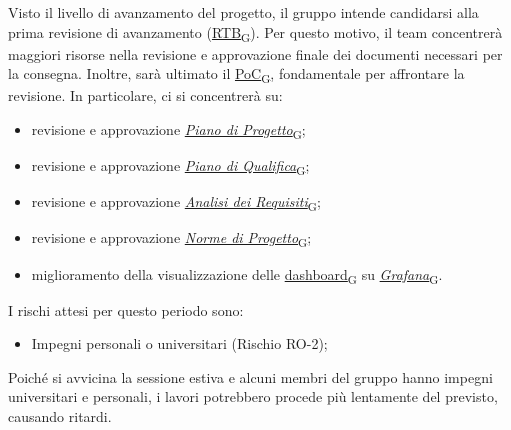 Visto il livello di avanzamento del progetto, il gruppo intende candidarsi alla prima revisione di avanzamento (\href{https://7last.github.io/docs/rtb/documentazione-interna/glossario\#requirements-and-technology-baseline}{RTB\textsubscript{G}}). Per questo motivo, il team concentrerà maggiori risorse nella revisione e approvazione finale dei documenti necessari per la consegna. Inoltre, sarà ultimato il \href{https://7last.github.io/docs/rtb/documentazione-interna/glossario\#proof-of-concept}{PoC\textsubscript{G}}, fondamentale per affrontare la revisione. In particolare, ci si concentrerà su:
\begin{itemize}
	\item revisione e approvazione \href{https://7last.github.io/docs/rtb/documentazione-interna/glossario\#piano-di-progetto}{\textit{Piano di Progetto}\textsubscript{G}};
	\item revisione e approvazione \href{https://7last.github.io/docs/rtb/documentazione-interna/glossario\#piano-di-qualifica}{\textit{Piano di Qualifica}\textsubscript{G}};
	\item revisione e approvazione \href{https://7last.github.io/docs/rtb/documentazione-interna/glossario\#analisi-dei-requisiti}{\textit{Analisi dei Requisiti}\textsubscript{G}};
	\item revisione e approvazione \href{https://7last.github.io/docs/rtb/documentazione-interna/glossario\#norme-di-progetto}{\textit{Norme di Progetto}\textsubscript{G}};
	\item miglioramento della visualizzazione delle \href{https://7last.github.io/docs/rtb/documentazione-interna/glossario\#dashboard}{dashboard\textsubscript{G}} su \href{https://7last.github.io/docs/rtb/documentazione-interna/glossario\#grafana}{\textit{Grafana}\textsubscript{G}}.
\end{itemize}

\newpage

I rischi attesi per questo periodo sono:
\begin{itemize}
    \item Impegni personali o universitari (Rischio RO-2);
\end{itemize}
Poiché si avvicina la sessione estiva e alcuni membri del gruppo hanno impegni universitari e personali, i lavori potrebbero procede più lentamente del previsto, causando ritardi.

